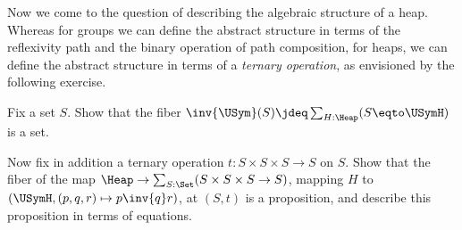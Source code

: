 Now we come to the question of describing the algebraic structure
of a heap.
Whereas for groups we can define the abstract structure
in terms of the reflexivity path and the binary operation of path composition,
for heaps, we can define the abstract structure
in terms of a \emph{ternary operation},
as envisioned by the following exercise.

\begin{exercise}\label{xca:heap-variety}
  Fix a set $S$.
  Show that the fiber $\inv{\USym}(S)\jdeq\sum_{H:\Heap}(S\eqto\USymH)$ is a set.

  Now fix in addition a ternary operation $t:S\times S\times S\to S$ on $S$.
  Show that the fiber of the map $\Heap \to \sum_{S:\Set}(S\times S\times S \to S)$,
  mapping $H$ to $(\USymH,(p,q,r)\mapsto p \inv{q} r)$,
  at $(S,t)$ is a proposition,
  and describe this proposition in terms of equations.
\end{exercise}


